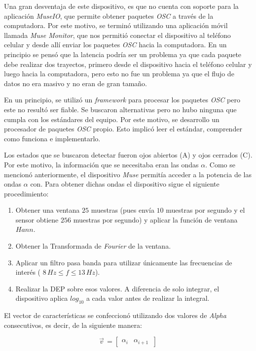 Una gran desventaja de este dispositivo, es que no cuenta con soporte para la aplicación \emph{MuseIO}, que permite obtener paquetes \emph{OSC} a través de la computadora. Por este motivo, se terminó utilizando una aplicación móvil llamada \emph{Muse Monitor}, que nos permitió conectar el dispositivo al teléfono celular y desde allí enviar los paquetes \emph{OSC} hacia la computadora. En un principio se pensó que la latencia podría ser un problema ya que cada paquete debe realizar dos trayectos, primero desde el dispositivo hacia el teléfono celular y luego hacia la computadora, pero esto no fue un problema ya que el flujo de datos no era masivo y no eran de gran tamaño.

En un principio, se utilizó un \emph{framework} para procesar los paquetes \emph{OSC} pero este no resultó ser fiable. Se buscaron alternativas pero no hubo ninguna que cumpla con los estándares del equipo. Por este motivo, se desarrollo un procesador de paquetes \emph{OSC} propio. Esto implicó leer el estándar, comprender como funciona e implementarlo.
 
 Los estados que se buscaron detectar fueron ojos abiertos (A) y ojos cerrados (C). Por este motivo, la información que se necesitaba eran las ondas $\alpha$. Como se mencionó anteriormente, el dispositivo \emph{Muse} permitía acceder a la potencia de las ondas $\alpha$ con. Para obtener dichas ondas el dispositivo sigue el siguiente procedimiento:
 
 \begin{enumerate}
 \item Obtener una ventana $25$ muestras (pues envía $10$ muestras por segundo y el sensor obtiene $256$ muestras por segundo) y aplicar la función de ventana $Hann$.
 \item Obtener la Transformada de \emph{Fourier} de la ventana.
 \item Aplicar un filtro pasa banda para utilizar únicamente las frecuencias de interés ( $ 8 \, Hz \leq f \leq 13 \, Hz$).
 \item Realizar la DEP sobre esos valores. A diferencia de solo integrar, el dispositivo aplica $log_{10}$  a cada valor antes de realizar la integral.
 \end{enumerate}

El vector de características se confeccionó utilizando dos valores de \emph{Alpha} consecutivos, es decir, de la siguiente manera:

\[
  \vec{v}^{\, }=
  \left[ {\begin{array}{cc}
   \alpha_{i}  & \alpha_{i + 1}  \     \end{array} } \right]
\]

